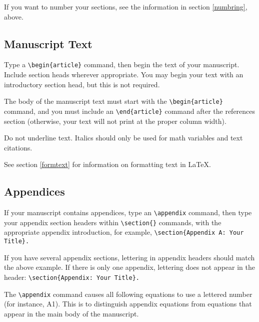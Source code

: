 \begin{article}
If you want to number your sections, see the information 
in section \ref{numbring}, above.

\subsection{Manuscript Text}

Type a \verb"\begin{article}" command, then begin 
the text of your manuscript.  Include section heads
wherever appropriate.  You may begin your text with 
an introductory section head, but this is not required.

The body of the manuscript text must start with the 
\verb"\begin{article}" command, and you must include 
an \verb"\end{article}" command after the references 
section (otherwise, your text will not print at the 
proper column width).

Do not underline text.  Italics should only be used 
for math variables and text citations.

See section \ref{formtext} for information on formatting
text in \LaTeX.


\subsection{Appendices}

If your manuscript contains appendices, type an
\verb"\appendix" command, then type your appendix
section headers within \verb"\section{}" commands,
with the appropriate appendix introduction, for example,
\verb"\section{Appendix A: Your Title}."

If you have several appendix sections, lettering in
appendix headers should match the above example.
If there is only one appendix, lettering does not
appear in the header: \verb"\section{Appendix: Your Title}."

The \verb"\appendix" command causes all following equations 
to use a lettered number (for instance, A1).  This is to 
distinguish appendix equations from equations that appear 
in the main body of the manuscript.


\end{article}
